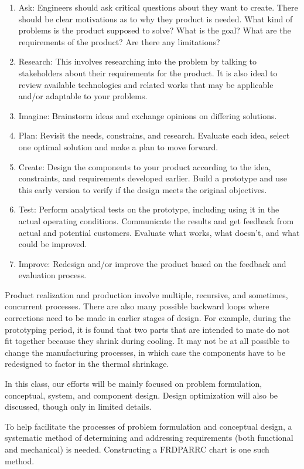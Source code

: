 \documentclass[
10pt,
a4paper,
openany,
svgnames,
]{book}
\begin{document}
\begin{enumerate}
\item Ask: Engineers should ask critical questions about they want to create. There should be clear motivations as to why they product is needed. What kind of problems is the product supposed to solve? What is the goal? What are the requirements of the product? Are there any limitations?
\item Research: This involves researching into the problem by talking to stakeholders about their requirements for the product. It is also ideal to review available technologies and related works that may be applicable and/or adaptable to your problems.
\item Imagine: Brainstorm ideas and exchange opinions on differing solutions.
\item Plan: Revisit the needs, constrains, and research. Evaluate each idea, select one optimal solution and make a plan to move forward.
\item Create: Design the components to your product according to the idea, constraints, and requirements developed earlier. Build a prototype and use this early version to verify if the design meets the original objectives.
\item Test: Perform analytical tests on the prototype, including using it in the actual operating conditions. Communicate the results and get feedback from actual and potential customers. Evaluate what works, what doesn't, and what could be improved.
\item Improve: Redesign and/or improve the product based on the feedback and evaluation process.
\end{enumerate}

Product realization and production involve multiple, recursive, and sometimes, concurrent processes. There are also many possible backward loops where corrections need to be made in earlier stages of design. For example, during the prototyping period, it is found that two parts that are intended to mate do not fit together because they shrink during cooling. It may not be at all possible to change the manufacturing processes, in which case the components have to be redesigned to factor in the thermal shrinkage.

In this class, our efforts will be mainly focused on problem formulation, conceptual, system, and component design. Design optimization will also be discussed, though only in limited details.

To help facilitate the processes of problem formulation and conceptual design, a systematic method of determining and addressing requirements (both functional and mechanical) is needed. Constructing a FRDPARRC chart is one such method.
\end{document}
